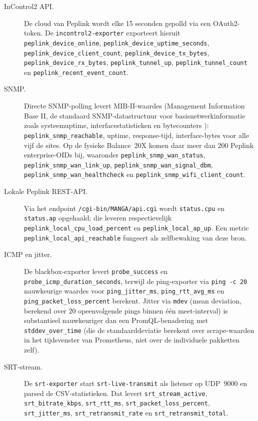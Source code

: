 \begin{description}
  \item[InControl2 API.] De cloud van Peplink wordt elke 15 seconden gepolld via een OAuth2-token. De \texttt{incontrol2-exporter} exporteert hieruit \texttt{peplink\_device\_online}, \texttt{peplink\_device\_uptime\_seconds}, \texttt{peplink\_device\_client\_count}, \texttt{peplink\_device\_tx\_bytes}, \texttt{peplink\_device\_rx\_bytes}, \texttt{peplink\_tunnel\_up}, \texttt{peplink\_tunnel\_count} en \texttt{peplink\_recent\_event\_count}.
  \item[SNMP.] Directe SNMP-polling levert MIB-II-waardes (Management Information Base II, de standaard SNMP-datastructuur voor basisnetwerkinformatie zoals systeemuptime, interfacestatistieken en bytecounters \autocite{Turnbull2016}): \texttt{peplink\_snmp\_reachable}, uptime, response-tijd, interface-bytes voor alle vijf de sites. Op de fysieke Balance~20X komen daar meer dan 200 Peplink enterprise-OIDs bij, waaronder \texttt{peplink\_snmp\_wan\_status}, \texttt{peplink\_snmp\_wan\_link\_up}, \texttt{peplink\_snmp\_wan\_signal\_dbm}, \texttt{peplink\_snmp\_wan\_healthcheck} en \texttt{peplink\_snmp\_wifi\_client\_count}.
  \item[Lokale Peplink REST-API.] Via het endpoint \texttt{/cgi-bin/MANGA/api.cgi} wordt \texttt{status.cpu} en \texttt{status.ap} opgehaald; die leveren respectievelijk \texttt{peplink\_local\_cpu\_load\_percent} en \texttt{peplink\_local\_ap\_up}. Een metric \texttt{peplink\_local\_api\_reachable} fungeert als zelfbewaking van deze bron.
  \item[ICMP en jitter.] De blackbox-exporter levert \texttt{probe\_success} en \texttt{probe\_icmp\_duration\_seconds}, terwijl de ping-exporter via \texttt{ping -c 20} nauwkeurige waardes voor \texttt{ping\_jitter\_ms}, \texttt{ping\_rtt\_avg\_ms} en \texttt{ping\_packet\_loss\_percent} berekent. Jitter via \texttt{mdev} (mean deviation, berekend over 20 opeenvolgende pings binnen één meet-interval) is substantieel nauwkeuriger dan een PromQL-benadering met \texttt{stddev\_over\_time} (die de standaarddeviatie berekent over scrape-waarden in het tijdsvenster van Prometheus, niet over de individuele pakketten zelf).
  \item[SRT-stream.] De \texttt{srt-exporter} start \texttt{srt-live-transmit} als listener op UDP~9000 en parsed de CSV-statistieken. Dat levert \texttt{srt\_stream\_active}, \texttt{srt\_bitrate\_kbps}, \texttt{srt\_rtt\_ms}, \texttt{srt\_packet\_loss\_percent}, \texttt{srt\_jitter\_ms}, \texttt{srt\_retransmit\_rate} en \texttt{srt\_retransmit\_total}.

\end{description}
